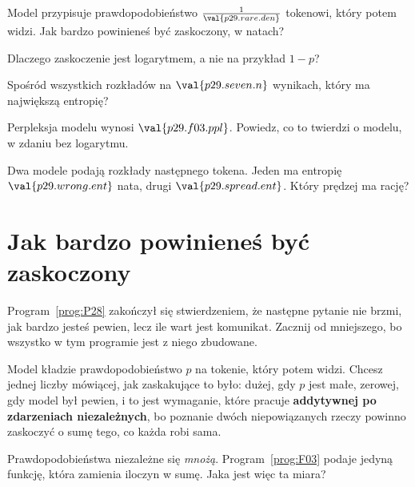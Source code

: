 \begin{quiz}
\item Model przypisuje prawdopodobieństwo $\frac{1}{\val{p29.rare.den}}$
  tokenowi, który potem widzi. Jak bardzo powinieneś być zaskoczony, w
  natach? 
\item Dlaczego zaskoczenie jest logarytmem, a nie na przykład $1 - p$?
\item Spośród wszystkich rozkładów na $\val{p29.seven.n}$ wynikach, który ma
  największą entropię? 
\item Perpleksja modelu wynosi $\val{p29.f03.ppl}$. Powiedz, co to twierdzi o
  modelu, w zdaniu bez logarytmu. 
\item Dwa modele podają rozkłady następnego tokena. Jeden ma entropię
  $\val{p29.wrong.ent}$ nata, drugi $\val{p29.spread.ent}$. Który prędzej ma
  rację? 
\end{quiz}

\section{Jak bardzo powinieneś być zaskoczony}
\label{sec:P29-surprise}

\begin{fr}
Program~\ref{prog:P28} zakończył się stwierdzeniem, że następne pytanie nie
brzmi, jak bardzo jesteś pewien, lecz ile wart jest komunikat. Zacznij od
mniejszego, bo wszystko w tym programie jest z niego zbudowane.

Model kładzie prawdopodobieństwo $p$ na tokenie, który potem widzi. Chcesz
jednej liczby mówiącej, jak zaskakujące to było: dużej, gdy $p$ jest małe,
zerowej, gdy model był pewien, i \dash{} to jest wymaganie, które pracuje
\dash{} \textbf{addytywnej po zdarzeniach niezależnych}, bo poznanie dwóch
niepowiązanych rzeczy powinno zaskoczyć o sumę tego, co każda robi sama.

Prawdopodobieństwa niezależne się \emph{mnożą}. Program~\ref{prog:F03} podaje
jedyną funkcję, która zamienia iloczyn w sumę. Jaka jest więc ta miara?
\dotline
\nextframe
\end{fr}

